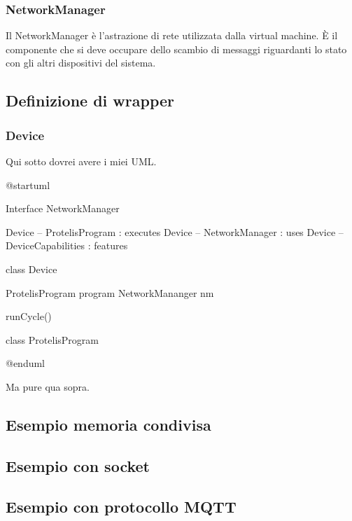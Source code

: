 \documentclass{article}
\begin{document}
\subsubsection{NetworkManager}

Il NetworkManager è l'astrazione di rete utilizzata dalla virtual machine. È il componente che si deve occupare dello scambio di messaggi riguardanti lo stato con gli altri dispositivi del sistema.

\subsection{Definizione di wrapper}

\subsubsection{Device}

Qui sotto dovrei avere i miei UML.

\begin{center}
\begin{plantuml}
@startuml

Interface NetworkManager

Device -- ProtelisProgram : executes
Device -- NetworkManager : uses
Device -- DeviceCapabilities : features

class Device {
  ProtelisProgram program
  NetworkMananger nm

  runCycle()
}

class ProtelisProgram {

}
@enduml
\end{plantuml}

\end{center}

Ma pure qua sopra.

\subsection{Esempio memoria condivisa}

\subsection{Esempio con socket}

\subsection{Esempio con protocollo MQTT}
\end{document}
